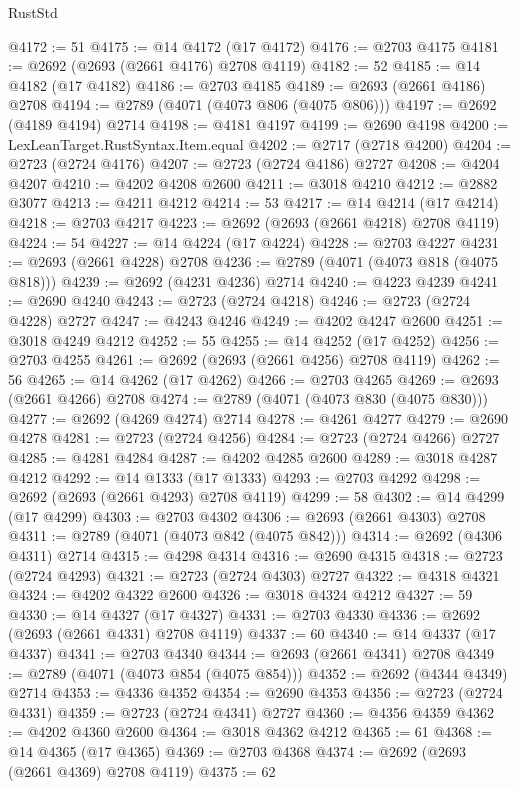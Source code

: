 \begin{lexlean}{RustStd}
\begin{coremodule}
@4172 := 51
@4175 := @14 @4172 (@17 @4172)
@4176 := @2703 @4175
@4181 := @2692 (@2693 (@2661 @4176) @2708 @4119)
@4182 := 52
@4185 := @14 @4182 (@17 @4182)
@4186 := @2703 @4185
@4189 := @2693 (@2661 @4186) @2708
@4194 := @2789 (@4071 (@4073 @806 (@4075 @806)))
@4197 := @2692 (@4189 @4194) @2714
@4198 := @4181 @4197
@4199 := @2690 @4198
@4200 := LexLeanTarget.RustSyntax.Item.equal
@4202 := @2717 (@2718 @4200)
@4204 := @2723 (@2724 @4176)
@4207 := @2723 (@2724 @4186) @2727
@4208 := @4204 @4207
@4210 := @4202 @4208 @2600
@4211 := @3018 @4210
@4212 := @2882 @3077
@4213 := @4211 @4212
@4214 := 53
@4217 := @14 @4214 (@17 @4214)
@4218 := @2703 @4217
@4223 := @2692 (@2693 (@2661 @4218) @2708 @4119)
@4224 := 54
@4227 := @14 @4224 (@17 @4224)
@4228 := @2703 @4227
@4231 := @2693 (@2661 @4228) @2708
@4236 := @2789 (@4071 (@4073 @818 (@4075 @818)))
@4239 := @2692 (@4231 @4236) @2714
@4240 := @4223 @4239
@4241 := @2690 @4240
@4243 := @2723 (@2724 @4218)
@4246 := @2723 (@2724 @4228) @2727
@4247 := @4243 @4246
@4249 := @4202 @4247 @2600
@4251 := @3018 @4249 @4212
@4252 := 55
@4255 := @14 @4252 (@17 @4252)
@4256 := @2703 @4255
@4261 := @2692 (@2693 (@2661 @4256) @2708 @4119)
@4262 := 56
@4265 := @14 @4262 (@17 @4262)
@4266 := @2703 @4265
@4269 := @2693 (@2661 @4266) @2708
@4274 := @2789 (@4071 (@4073 @830 (@4075 @830)))
@4277 := @2692 (@4269 @4274) @2714
@4278 := @4261 @4277
@4279 := @2690 @4278
@4281 := @2723 (@2724 @4256)
@4284 := @2723 (@2724 @4266) @2727
@4285 := @4281 @4284
@4287 := @4202 @4285 @2600
@4289 := @3018 @4287 @4212
@4292 := @14 @1333 (@17 @1333)
@4293 := @2703 @4292
@4298 := @2692 (@2693 (@2661 @4293) @2708 @4119)
@4299 := 58
@4302 := @14 @4299 (@17 @4299)
@4303 := @2703 @4302
@4306 := @2693 (@2661 @4303) @2708
@4311 := @2789 (@4071 (@4073 @842 (@4075 @842)))
@4314 := @2692 (@4306 @4311) @2714
@4315 := @4298 @4314
@4316 := @2690 @4315
@4318 := @2723 (@2724 @4293)
@4321 := @2723 (@2724 @4303) @2727
@4322 := @4318 @4321
@4324 := @4202 @4322 @2600
@4326 := @3018 @4324 @4212
@4327 := 59
@4330 := @14 @4327 (@17 @4327)
@4331 := @2703 @4330
@4336 := @2692 (@2693 (@2661 @4331) @2708 @4119)
@4337 := 60
@4340 := @14 @4337 (@17 @4337)
@4341 := @2703 @4340
@4344 := @2693 (@2661 @4341) @2708
@4349 := @2789 (@4071 (@4073 @854 (@4075 @854)))
@4352 := @2692 (@4344 @4349) @2714
@4353 := @4336 @4352
@4354 := @2690 @4353
@4356 := @2723 (@2724 @4331)
@4359 := @2723 (@2724 @4341) @2727
@4360 := @4356 @4359
@4362 := @4202 @4360 @2600
@4364 := @3018 @4362 @4212
@4365 := 61
@4368 := @14 @4365 (@17 @4365)
@4369 := @2703 @4368
@4374 := @2692 (@2693 (@2661 @4369) @2708 @4119)
@4375 := 62

\end{coremodule}
\end{lexlean}
